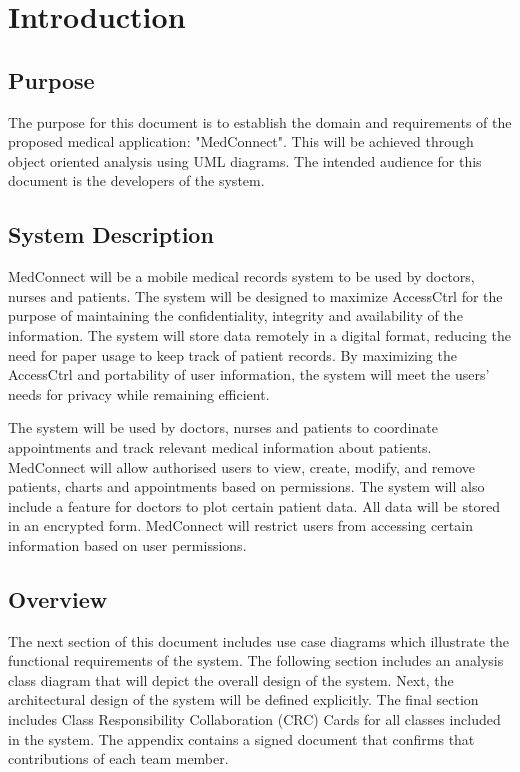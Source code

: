 \documentclass[12pt]{article}
\begin{document}
\maketitle
\section{Introduction}
\subsection{Purpose}
The purpose for this document is to establish the domain and requirements of the proposed medical application: "MedConnect". This will be achieved through object oriented analysis using UML diagrams. The intended audience for this document is the developers of the system.

\subsection{System Description}
MedConnect will be a mobile medical records system to be used by doctors, nurses and patients. The system will be designed to maximize AccessCtrl for the purpose of maintaining the confidentiality, integrity and availability of the information. The system will store data remotely in a digital format, reducing the need for paper usage to keep track of patient records. By maximizing the AccessCtrl and portability of user information, the system will meet the users' needs for privacy while remaining efficient.

The system will be used by doctors, nurses and patients to coordinate appointments and track relevant medical information about patients. MedConnect will allow authorised users to view, create, modify, and remove patients, charts and appointments based on permissions. The system will also include a feature for doctors to plot certain patient data. All data will be stored in an encrypted form. MedConnect will restrict users from accessing certain information based on user permissions.

\subsection{Overview}

The next section of this document includes use case diagrams which illustrate the functional requirements of the system. The following section includes an analysis class diagram that will depict the overall design of the system. Next, the architectural design of the system will be defined explicitly. The final section includes Class Responsibility Collaboration (CRC) Cards for all classes included in the system. The appendix contains a signed document that confirms that contributions of each team member.
\newpage
\end{document}
